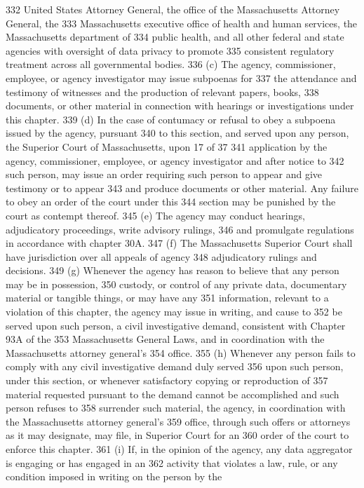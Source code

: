332 United States Attorney General, the office of the Massachusetts Attorney General, the
333 Massachusetts executive office of health and human services, the Massachusetts department of
334 public health, and all other federal and state agencies with oversight of data privacy to promote
335 consistent regulatory treatment across all governmental bodies.
336 (c) The agency, commissioner, employee, or agency investigator may issue subpoenas for
337 the attendance and testimony of witnesses and the production of relevant papers, books,
338 documents, or other material in connection with hearings or investigations under this chapter.
339 (d) In the case of contumacy or refusal to obey a subpoena issued by the agency, pursuant
340 to this section, and served upon any person, the Superior Court of Massachusetts, upon
17 of 37
341 application by the agency, commissioner, employee, or agency investigator and after notice to
342 such person, may issue an order requiring such person to appear and give testimony or to appear
343 and produce documents or other material. Any failure to obey an order of the court under this
344 section may be punished by the court as contempt thereof.
345 (e) The agency may conduct hearings, adjudicatory proceedings, write advisory rulings,
346 and promulgate regulations in accordance with chapter 30A.
347 (f) The Massachusetts Superior Court shall have jurisdiction over all appeals of agency
348 adjudicatory rulings and decisions.
349 (g) Whenever the agency has reason to believe that any person may be in possession,
350 custody, or control of any private data, documentary material or tangible things, or may have any
351 information, relevant to a violation of this chapter, the agency may issue in writing, and cause to
352 be served upon such person, a civil investigative demand, consistent with Chapter 93A of the
353 Massachusetts General Laws, and in coordination with the Massachusetts attorney general’s
354 office.
355 (h) Whenever any person fails to comply with any civil investigative demand duly served
356 upon such person, under this section, or whenever satisfactory copying or reproduction of
357 material requested pursuant to the demand cannot be accomplished and such person refuses to
358 surrender such material, the agency, in coordination with the Massachusetts attorney general’s
359 office, through such offers or attorneys as it may designate, may file, in Superior Court for an
360 order of the court to enforce this chapter.
361 (i) If, in the opinion of the agency, any data aggregator is engaging or has engaged in an
362 activity that violates a law, rule, or any condition imposed in writing on the person by the
